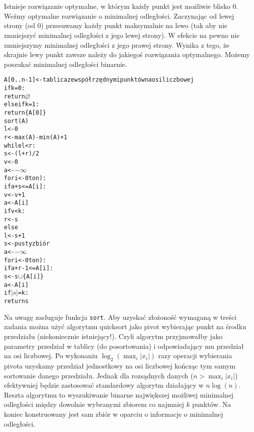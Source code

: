 \documentclass[a4paper,12pt]{article}
\begin{document}
\section{}
Istnieje rozwiązanie optymalne, w którym każdy punkt jest możliwie blisko 0. Weźmy optymalne rozwiązanie o minimalnej odległości. Zaczynając od lewej strony (od 0) przesuwamy każdy punkt maksymalnie na lewo (tak aby nie zmniejszyć minimalnej odległości z jego lewej strony). W efekcie na pewno nie zmniejszymy minimalnej odległości z jego prawej strony. Wynika z tego, że skrajnie lewy punkt zawsze należy do jakiegoś rozwiązania optymalnego. Możemy poszukać minimalnej odległości binarnie.
\begin{alltt}
 A[0..n-1] <- tablica ze współrzędnymi punktów na osi liczbowej
 if k = 0:
    return \(\varnothing\)
 else if k = 1:
    return \{A[0]\}
 sort(A)
 l <- 0
 r <- max(A) - min(A) + 1
 while l < r:
    s <- (l+r)/2
    v <- 0
    a <- \(-\infty\)
    for i <- 0 to n):
        if a + s <= A[i]:
            v <- v + 1
            a <- A[i]
    if v < k:
        r <- s
    else
        l <- s+1
 s <- pusty zbiór
 a <- \(-\infty\)
 for i <- 0 to n):
    if a + r-1 <= A[i]:
        s <- s \(\cup\) \{A[i]\}
        a <- A[i]
        if \(|s|\)=k:
            return s
\end{alltt}
Na uwagę zasługuje funkcja \verb|sort|. Aby uzyskać złożoność wymaganą w treści zadania można użyć algorytmu quicksort jako pivot wybierając punkt na środku przedziału (niekoniecznie istniejący!). Czyli algorytm przyjmowałby jako parametry przedział w tablicy (do posortowania) i odpowiadający mu przedział na osi liczbowej. Po wykonaniu $\log_2(\max_i{|x_i|})$ razy operacji wybierania pivota uzyskamy przedział jednostkowy na osi liczbowej kończąc tym samym sortowanie danego przedziału. Jednak dla rozsądnych danych ($n>\max_i{|x_i|}$) efektywniej będzie zastosować standardowy algorytm działający w $n\log(n)$. Reszta algorytmu to wyszukiwanie binarne największej możliwej minimalnej odległości między dowolnie wybranymi zbiorem co najmniej $k$ punktów. Na koniec konstruowany jest sam zbiór w oparciu o informacje o minimalnej odległości.
\section{}
\end{document}
